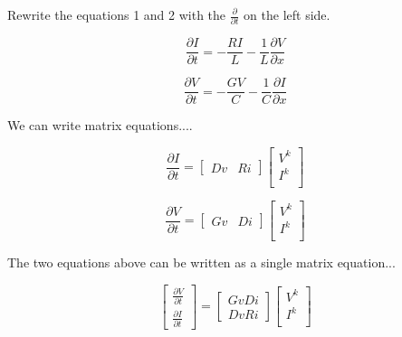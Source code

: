 \documentclass[12pt, letterpaper]{article}
\begin{document}
Rewrite the equations 1 and 2 with the $\frac{\partial}{\partial t}$ on the left side.

\begin{equation} \frac{\partial{I}}{\partial{t}} = - \frac{R I}{L} - \frac{1}{L} \frac{\partial{V}}{\partial{x}} \end{equation}


\begin{equation} \frac{\partial{V}}{\partial{t}} = -\frac{G V}{C} - \frac{1}{C} \frac{\partial{I}}{\partial{x}}\end{equation}

We can write matrix equations....

\begin{equation}
\frac{\partial{I}}{\partial{t}} 
=
	\begin{bmatrix}
		Dv & Ri
	\end{bmatrix}
	\begin{bmatrix}
		V^k \\
		I^k \\
	\end{bmatrix}
\end{equation}

\begin{equation}
	\frac{\partial{V}}{\partial{t}} 
	=
	\begin{bmatrix}
		Gv & Di
	\end{bmatrix}
	\begin{bmatrix}
		V^k \\
		I^k \\
	\end{bmatrix}
\end{equation}

The two equations above can be written as a single matrix equation...

\begin{equation}
    \begin{bmatrix}
    	\frac{\partial{V}}{\partial{t}} \\
    	\frac{\partial{I}}{\partial{t}} 
    \end{bmatrix}	
	=
	\begin{bmatrix}
		Gv Di \\
		Dv Ri
	\end{bmatrix}
	\begin{bmatrix}
		V^k \\
		I^k \\
	\end{bmatrix}
\end{equation}
\end{document}
